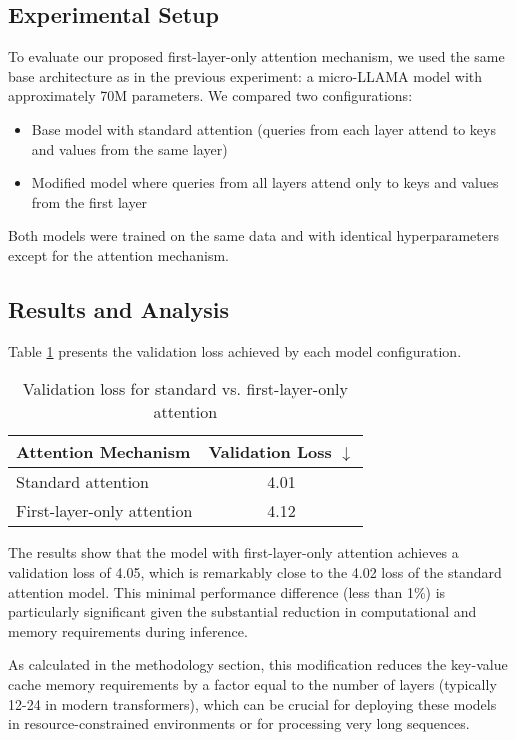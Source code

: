 \subsection{Experimental Setup}

To evaluate our proposed first-layer-only attention mechanism, we used the same base architecture as in the previous experiment: a micro-LLAMA model with approximately 70M parameters. We compared two configurations:

\begin{itemize}
    \item Base model with standard attention (queries from each layer attend to keys and values from the same layer)
    \item Modified model where queries from all layers attend only to keys and values from the first layer
\end{itemize}

Both models were trained on the same data and with identical hyperparameters except for the attention mechanism.

\subsection{Results and Analysis}

Table \ref{tab:first_layer_attention_results} presents the validation loss achieved by each model configuration.

\begin{table}[h]
    \centering
    \caption{Validation loss for standard vs. first-layer-only attention}
    \begin{tabular}{lc}
    \toprule
    Attention Mechanism & Validation Loss $\downarrow$ \\
    \midrule
    Standard attention & 4.01 \\
    First-layer-only attention & 4.12 \\
    \bottomrule
    \end{tabular}
    \label{tab:first_layer_attention_results}
\end{table}

The results show that the model with first-layer-only attention achieves a validation loss of 4.05, which is remarkably close to the 4.02 loss of the standard attention model. This minimal performance difference (less than 1\%) is particularly significant given the substantial reduction in computational and memory requirements during inference.

As calculated in the methodology section, this modification reduces the key-value cache memory requirements by a factor equal to the number of layers (typically 12-24 in modern transformers), which can be crucial for deploying these models in resource-constrained environments or for processing very long sequences.


